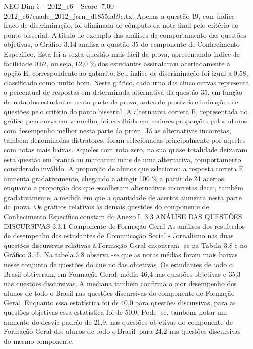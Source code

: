 \begin{textsample}{NEG Dim 3 – 2012\_c6 – Score -7.00 – 2012\_c6/enade\_2012\_jorn\_d0855fab9c.txt}
Apenas a questão 19, com índice fraco de discriminação, foi eliminada do cômputo da nota final pelo critério do ponto bisserial.
A título de exemplo das análises do comportamento das questões objetivas, o Gráfico 3.14 analisa a questão 35 do componente de Conhecimento Específico.
Esta foi a sexta questão mais fácil da prova, apresentando índice de facilidade 0,62, ou seja, 62,0 \% dos estudantes assinalaram acertadamente a opção E, correspondente ao gabarito.
Seu índice de discriminação foi igual a 0,58, classificado como muito bom.
Neste gráfico, cada uma das cinco curvas representa o percentual de respostas em determinada alternativa da questão 35, em função da nota dos estudantes nesta parte da prova, antes de possíveis eliminações de questões pelo critério do ponto bisserial.
A alternativa correta E, representada no gráfico pela curva em vermelho, foi escolhida em maiores proporções pelos alunos com desempenho melhor nesta parte da prova.
Já as alternativas incorretas, também denominadas distratores, foram selecionadas principalmente por aqueles com notas mais baixas.
Aqueles com nota zero, na sua quase totalidade deixaram esta questão em branco ou marcaram mais de uma alternativa, comportamento considerado inválido.
A proporção de alunos que selecionou a resposta correta E aumenta gradativamente, chegando a atingir 100 \% a partir de 24 acertos, enquanto a proporção dos que escolheram alternativas incorretas decai, também gradativamente, a medida em que a quantidade de acertos aumenta nesta parte da prova.
Os gráficos relativos às demais questões do componente de Conhecimento Específico constam do Anexo I. 3.3 ANÁLISE DAS QUESTÕES DISCURSIVAS 3.3.1 Componente de Formação Geral As análises dos resultados de desempenho dos estudantes de Comunicação Social - Jornalismo nas duas questões discursivas relativas à Formação Geral encontram -se na Tabela 3.8 e no Gráfico 3.15.
Na tabela 3.8 observa -se que as notas médias foram mais baixas nesse conjunto de questões do que no das objetivas.
Os estudantes de todo o Brasil obtiveram, em Formação Geral, média 46,4 nas questões objetivas e 35,3 nas questões discursivas.
A mediana também confirma o pior desempenho dos alunos de todo o Brasil nas questões discursivas do componente de Formação Geral.
Enquanto essa estatística foi de 40,0 para questões discursivas, para as questões objetivas essa estatística foi de 50,0.
Pode -se, também, notar um aumento do desvio padrão de 21,9, nas questões objetivas do componente de Formação Geral dos alunos de todo o Brasil, para 24,2 nas questões discursivas do mesmo componente.

\end{textsample}

